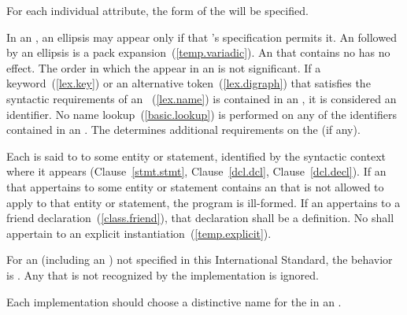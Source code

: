 \pnum
\begin{note} For each individual attribute, the form of the
 will be specified. \end{note}

\pnum
In an , an ellipsis may appear only if that
's specification permits it. An  followed
by an ellipsis is a pack expansion~(\ref{temp.variadic}).
An  that contains no  has no
effect. The order in which the  appear in an
 is not significant. If a
keyword~(\ref{lex.key})
or an alternative token~(\ref{lex.digraph}) that satisfies the syntactic requirements
of an ~(\ref{lex.name}) is
contained in
an , it is considered an identifier. No name
lookup~(\ref{basic.lookup}) is performed on any of the identifiers contained in an
. The  determines additional
requirements on the  (if any).

\pnum
Each  is said to  to some entity or
statement, identified by the syntactic context where it appears
(Clause~\ref{stmt.stmt}, Clause~\ref{dcl.dcl},
Clause~\ref{dcl.decl}). If an  that appertains to some
entity or statement contains an  that
is not allowed to apply to that
entity or statement, the program is ill-formed. If an 
appertains to a friend declaration~(\ref{class.friend}), that declaration shall be a
definition. No  shall appertain to an explicit
instantiation~(\ref{temp.explicit}).

\pnum
For an 
(including an )
not specified in this International Standard, the
behavior is .
Any  that is not recognized by the implementation
is ignored.
\begin{note}
Each implementation should choose a distinctive name for the
 in an .
\end{note}

